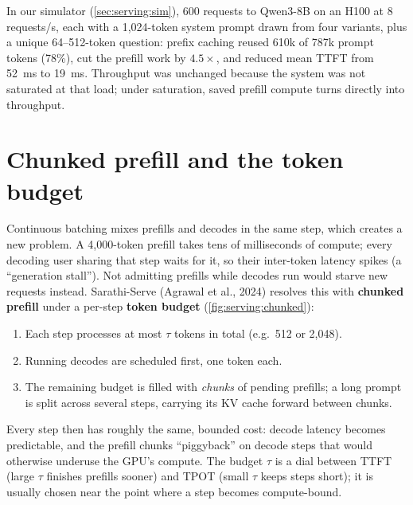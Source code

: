 \begin{napkinmath}
In our simulator (\cref{sec:serving:sim}), 600 requests to Qwen3-8B on an H100 at 8 requests/s, each with a
1,024-token system prompt drawn from four variants, plus a unique 64--512-token question: prefix caching
reused 610k of 787k prompt tokens (78\%), cut the prefill work by $4.5\times$, and reduced mean TTFT from
\SI{52}{ms} to \SI{19}{ms}. Throughput was unchanged because the system was not saturated at that load;
under saturation, saved prefill compute turns directly into throughput.
\end{napkinmath}

\section{Chunked prefill and the token budget}\label{sec:serving:chunked}

Continuous batching mixes prefills and decodes in the same step, which creates a new problem. A
4,000-token prefill takes tens of milliseconds of compute; every decoding user sharing that step waits
for it, so their inter-token latency spikes (a ``generation stall''). Not admitting prefills while
decodes run would starve new requests instead. Sarathi-Serve (Agrawal et al., 2024) resolves this with
\textbf{chunked prefill} under a per-step \textbf{token budget} (\cref{fig:serving:chunked}):
\begin{enumerate}
  \item Each step processes at most $\tau$ tokens in total (e.g.\ 512 or 2,048).
  \item Running decodes are scheduled first, one token each.
  \item The remaining budget is filled with \emph{chunks} of pending prefills; a long prompt is split
    across several steps, carrying its KV cache forward between chunks.
\end{enumerate}
Every step then has roughly the same, bounded cost: decode latency becomes predictable, and the
prefill chunks ``piggyback'' on decode steps that would otherwise underuse the GPU's compute. The
budget $\tau$ is a dial between TTFT (large $\tau$ finishes prefills sooner) and TPOT (small $\tau$ keeps
steps short); it is usually chosen near the point where a step becomes compute-bound.

